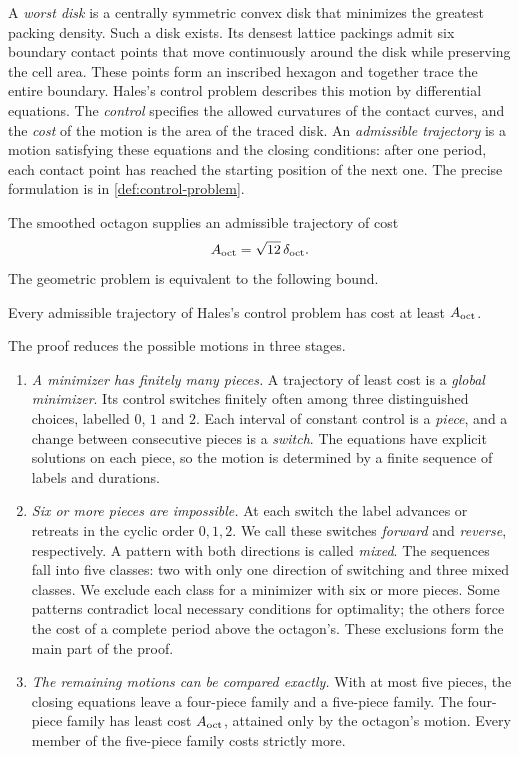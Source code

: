 A \emph{worst disk} is a centrally symmetric convex disk that minimizes the greatest packing
density. Such a disk exists. Its densest lattice packings admit six boundary contact points that
move continuously around the disk while preserving the cell area. These points form an inscribed
hexagon and together trace the entire boundary. Hales's control problem describes this motion by
differential equations. The \emph{control} specifies the allowed curvatures of the contact curves,
and the \emph{cost} of the motion is the area of the traced disk. An \emph{admissible trajectory}
is a motion satisfying these equations and the closing conditions: after one period, each contact
point has reached the starting position of the next one. The precise formulation is in
\cref{def:control-problem}.

The smoothed octagon supplies an admissible trajectory of cost
\[
  A_{\mathrm{oct}}=\sqrt{12}\,\delta_{\mathrm{oct}}.
\]
The geometric problem is equivalent to the following bound.

\begin{theorem}\label{thm:control}
Every admissible trajectory of Hales's control problem has cost at least $A_{\mathrm{oct}}$.
\end{theorem}

The proof reduces the possible motions in three stages.
\begin{enumerate}[label=(\arabic*)]
\item \emph{A minimizer has finitely many pieces.}
A trajectory of least cost is a \emph{global minimizer}. Its control switches finitely often
among three distinguished choices, labelled $0$, $1$ and $2$. Each interval of constant control
is a \emph{piece}, and a change between consecutive pieces is a \emph{switch}. The equations
have explicit solutions on each piece, so the motion is determined by a finite sequence of
labels and durations.
\item \emph{Six or more pieces are impossible.}
At each switch the label advances or retreats in the cyclic order $0,1,2$. We call these switches
\emph{forward} and \emph{reverse}, respectively. A pattern with both directions is called
\emph{mixed}. The sequences fall into five classes: two with only one direction of switching
and three mixed classes. We exclude each class for a minimizer with six or more pieces. Some
patterns contradict local necessary conditions for optimality; the others force the cost of a
complete period above the octagon's. These exclusions form the main part of the proof.
\item \emph{The remaining motions can be compared exactly.}
With at most five pieces, the closing equations leave a four-piece family and a five-piece
family. The four-piece family has least cost $A_{\mathrm{oct}}$, attained only by the octagon's motion.
Every member of the five-piece family costs strictly more.
\end{enumerate}

